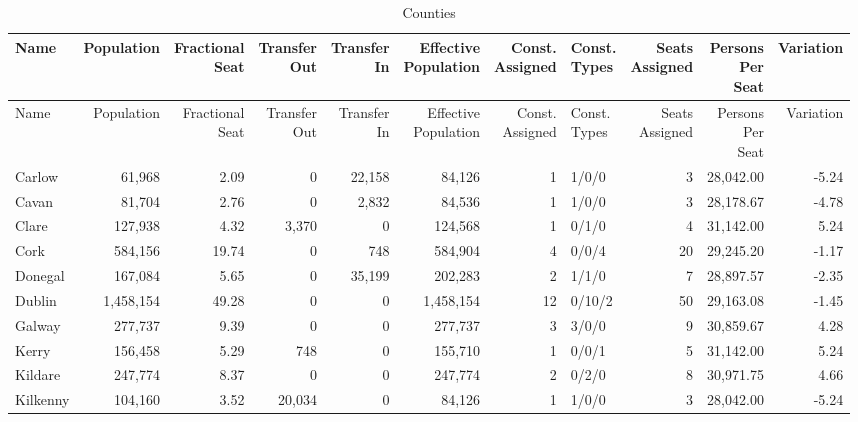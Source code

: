 \documentclass[a4paper]{article}
\begin{document}
\begin{longtable}{lrrrrrrlrrr}
\caption{Counties}
\\ \toprule
Name &Population &\shortstack{Fractional\\Seat} &\shortstack{Transfer\\Out} &\shortstack{Transfer\\In} &\shortstack{Effective\\Population} &\shortstack{Const.\\Assigned} &\shortstack{Const.\\Types} &\shortstack{Seats\\Assigned} &\shortstack{Persons\\Per\\Seat} &Variation \\ \midrule
\endfirsthead
\toprule
Name &Population &\shortstack{Fractional\\Seat} &\shortstack{Transfer\\Out} &\shortstack{Transfer\\In} &\shortstack{Effective\\Population} &\shortstack{Const.\\Assigned} &\shortstack{Const.\\Types} &\shortstack{Seats\\Assigned} &\shortstack{Persons\\Per\\Seat} &Variation \\ \midrule
\endhead
\bottomrule
\endfoot
Carlow&61,968& 2.09&0&22,158&84,126&1&1/0/0&3&28,042.00&-5.24\\ 
Cavan&81,704& 2.76&0&2,832&84,536&1&1/0/0&3&28,178.67&-4.78\\ 
Clare&127,938& 4.32&3,370&0&124,568&1&0/1/0&4&31,142.00& 5.24\\ 
Cork&584,156&19.74&0&748&584,904&4&0/0/4&20&29,245.20&-1.17\\ 
Donegal&167,084& 5.65&0&35,199&202,283&2&1/1/0&7&28,897.57&-2.35\\ 
Dublin&1,458,154&49.28&0&0&1,458,154&12&0/10/2&50&29,163.08&-1.45\\ 
Galway&277,737& 9.39&0&0&277,737&3&3/0/0&9&30,859.67& 4.28\\ 
Kerry&156,458& 5.29&748&0&155,710&1&0/0/1&5&31,142.00& 5.24\\ 
Kildare&247,774& 8.37&0&0&247,774&2&0/2/0&8&30,971.75& 4.66\\ 
Kilkenny&104,160& 3.52&20,034&0&84,126&1&1/0/0&3&28,042.00&-5.24\\ 

\end{longtable}
\end{document}
